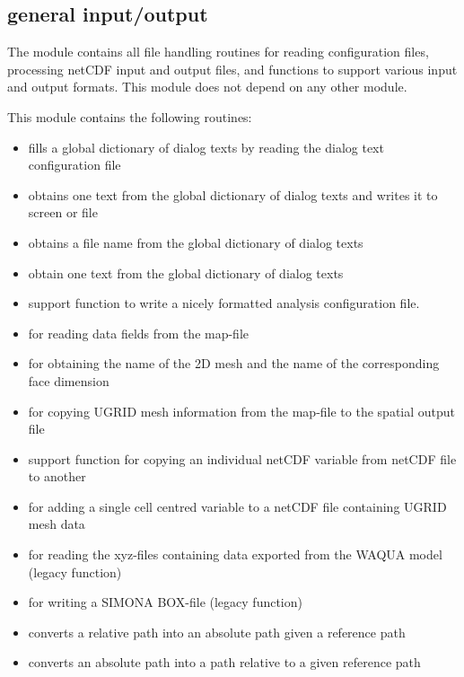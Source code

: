 \subsection{general input/output }

The  module contains all file handling routines for reading configuration files, processing netCDF input and output files, and functions to support various input and output formats.
This module does not depend on any other \dfastbe module.

This module contains the following routines:

\begin{itemize}
\item {} fills a global dictionary of dialog texts by reading the dialog text configuration file
\item {} obtains one text from the global dictionary of dialog texts and writes it to screen or file
\item {} obtains a file name from the global dictionary of dialog texts
\item {} obtain one text from the global dictionary of dialog texts

\item {} support function to write a nicely formatted analysis configuration file.

\item {} for reading data fields from the \dflowfm map-file
\item {} for obtaining the name of the 2D mesh and the name of the corresponding face dimension
\item {} for copying UGRID mesh information from the \dflowfm map-file to the spatial output file
\item {} support function for copying an individual netCDF variable from netCDF file to another
\item {} for adding a single cell centred variable to a netCDF file containing UGRID mesh data

\item {} for reading the xyz-files containing data exported from the WAQUA model (legacy function)
\item {} for writing a SIMONA BOX-file (legacy function)

\item {} converts a relative path into an absolute path given a reference path
\item {} converts an absolute path into a path relative to a given reference path


\end{itemize}
